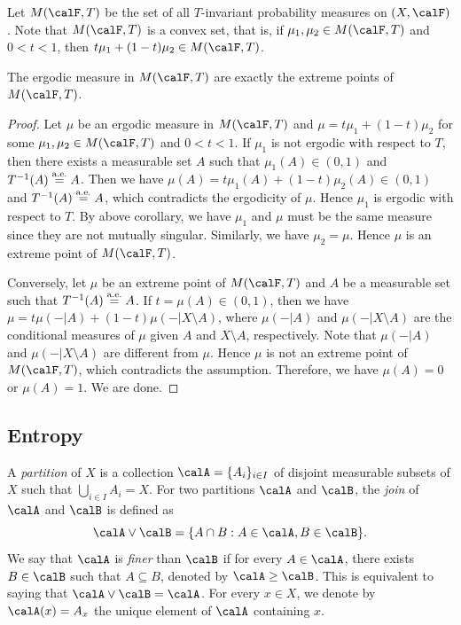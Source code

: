   Let $M(\calF, T)$ be the set of all $T$-invariant probability measures on $(X, \calF)$.
  Note that $M(\calF, T)$ is a convex set, that is, if $\mu_1, \mu_2 \in M(\calF, T)$ and $0 < t < 1$, then $t \mu_1 + (1-t) \mu_2 \in M(\calF, T)$.

  \begin{theorem}
    The ergodic measure in $M(\calF,T)$ are exactly the extreme points of $M(\calF,T)$.
  \end{theorem}
  \begin{proof}
    Let $\mu$ be an ergodic measure in $M(\calF,T)$ and $\mu = t \mu_1 + (1-t) \mu_2$ for some $\mu_1, \mu_2 \in M(\calF,T)$ and $0 < t < 1$. 
    If $\mu_1$ is not ergodic with respect to $T$, then there exists a measurable set $A$ such that $\mu_1(A) \in (0,1)$ and $T^{-1}(A) \overset{\text{a.e.}}{=} A$. 
    Then we have $\mu(A) = t \mu_1(A) + (1-t) \mu_2(A) \in (0,1)$ and $T^{-1}(A) \overset{\text{a.e.}}{=} A$, which contradicts the ergodicity of $\mu$.
    Hence $\mu_1$ is ergodic with respect to $T$.
    By above corollary, we have $\mu_1$ and $\mu$ must be the same measure since they are not mutually singular.
    Similarly, we have $\mu_2 = \mu$.
    Hence $\mu$ is an extreme point of $M(\calF,T)$.

    Conversely, let $\mu$ be an extreme point of $M(\calF,T)$ and $A$ be a measurable set such that $T^{-1}(A) \overset{\text{a.e.}}{=} A$. 
    If $t = \mu(A) \in (0,1)$, then we have $\mu = t \mu(-|A) + (1-t) \mu(-|X \setminus A)$, where $\mu(-|A)$ and $\mu(-|X \setminus A)$ are the conditional measures of $\mu$ given $A$ and $X \setminus A$, respectively.
    Note that $\mu(-|A)$ and $\mu(-|X \setminus A)$ are different from $\mu$.
    Hence $\mu$ is not an extreme point of $M(\calF,T)$, which contradicts the assumption.
    Therefore, we have $\mu(A) = 0$ or $\mu(A) = 1$.
    We are done.
  \end{proof}


\subsection{Entropy}

  A \emph{partition} of $X$ is a collection $\calA = \{A_i\}_{i \in I}$ of disjoint measurable subsets of $X$ such that $\bigcup_{i \in I} A_i = X$. 
  For two partitions $\calA$ and $\calB$, the \emph{join} of $\calA$ and $\calB$ is defined as
  \[
  \calA \vee \calB = \{A \cap B : A \in \calA, B \in \calB\}.
  \]
  We say that $\calA$ is \emph{finer} than $\calB$ if for every $A \in \calA$, there exists $B \in \calB$ such that $A \subseteq B$, denoted by $\calA \geq \calB$.
  This is equivalent to saying that $\calA \vee \calB = \calA$.
  For every $x \in X$, we denote by $\calA(x)=A_x$ the unique element of $\calA$ containing $x$.


